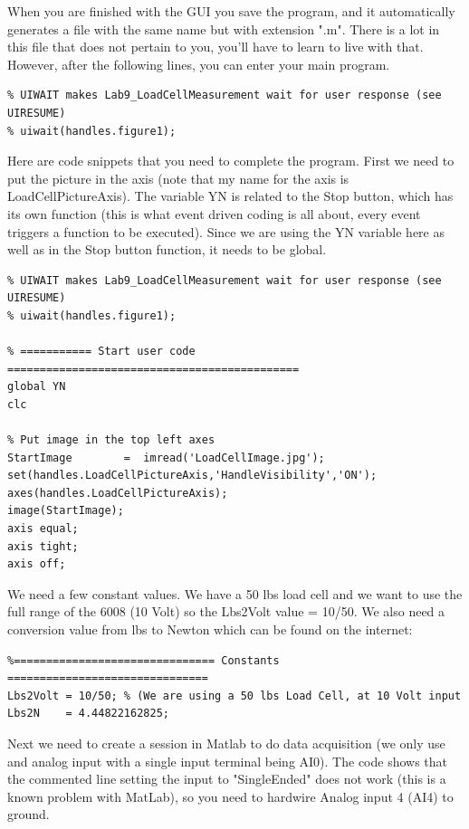 \documentclass[12pt,letterpaper]{article}
\begin{document}
When you are finished with the GUI you save the program, and it automatically generates a file with the same name but with extension ".m". There is a lot in this file that does not pertain to you, you'll have to learn to live with that. However, after the following lines, you can enter your main program. 

\begin{lstlisting}
% UIWAIT makes Lab9_LoadCellMeasurement wait for user response (see UIRESUME)
% uiwait(handles.figure1);
\end{lstlisting}

\newpage
Here are code snippets that you need to complete the program. First we need to put the picture in the axis (note that my name for the axis is LoadCellPictureAxis). The variable YN is related to the Stop button, which has its own function (this is what event driven coding is all about, every event triggers a function to be executed). Since we are using the YN variable here as well as in the Stop button function, it needs to be global.

\begin{lstlisting}
% UIWAIT makes Lab9_LoadCellMeasurement wait for user response (see UIRESUME)
% uiwait(handles.figure1);

% =========== Start user code =============================================
global YN
clc

% Put image in the top left axes
StartImage        =  imread('LoadCellImage.jpg');
set(handles.LoadCellPictureAxis,'HandleVisibility','ON');
axes(handles.LoadCellPictureAxis);
image(StartImage);
axis equal;
axis tight;
axis off;
\end{lstlisting}

We need a few constant values. We have a 50 lbs load cell and we want to use the full range of the 6008 (10 Volt) so the Lbs2Volt value = 10/50. We also need a conversion value from lbs to Newton which can be found on the internet:


\begin{lstlisting}
%=============================== Constants ===============================
Lbs2Volt = 10/50; % (We are using a 50 lbs Load Cell, at 10 Volt input
Lbs2N    = 4.44822162825;
\end{lstlisting}

Next we need to create a session in Matlab to do data acquisition (we only use and analog input with a single input terminal being AI0). The code shows that the commented line setting the input to "SingleEnded" does not work (this is a known problem with MatLab), so you need to hardwire Analog input 4 (AI4) to ground.
\end{document}
